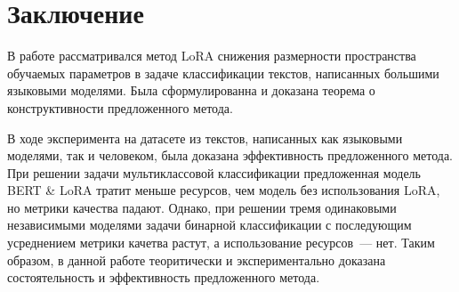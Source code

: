 \newpage

\section{Заключение}
В работе рассматривался метод LoRA снижения размерности пространства обучаемых параметров в задаче классификации текстов, написанных большими языковыми моделями. Была сформулированна и доказана теорема о конструктивности предложенного метода.

В ходе эксперимента на датасете из текстов, написанных как языковыми моделями, так и человеком, была доказана эффективность предложенного метода.
При решении задачи мультиклассовой классификации предложенная модель BERT \& LoRA  тратит меньше ресурсов, чем модель без использования LoRA, но метрики качества падают. Однако, при решении тремя одинаковыми независимыми моделями задачи бинарной классификации с последующим усреднением метрики качетва растут, а использование ресурсов~--- нет. Таким образом, в данной работе теоритически и экспериментально доказана состоятельность и эффективность предложенного метода.

